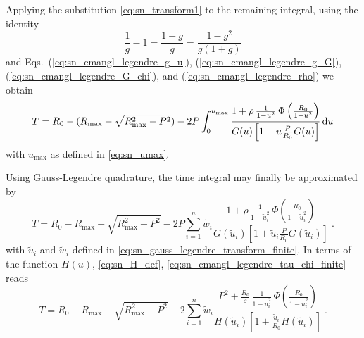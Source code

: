 Applying the substitution \cref{eq:sn_transform1} to the remaining integral, using the identity
%
\begin{equation*}
    \frac{1}{g} - 1 = \frac{1-g}{g} = \frac{1-g^2}{g(1+g)}
\end{equation*}
%
and Eqs.~(\ref{eq:sn_cmangl_legendre_g_u}), (\ref{eq:sn_cmangl_legendre_g_G}), (\ref{eq:sn_cmangl_legendre_G_chi}), and (\ref{eq:sn_cmangl_legendre_rho})
we obtain
%
\begin{equation}
    \label{eq:sn_reduced_tau_finite_G_legendre}
    T = R_0 -
        (R_\mathrm{max} - \sqrt{ R_\mathrm{max}^2 - P^2 }) - 2 P \int_0^{u_\mathrm{max}}
        \frac{ 1 + \rho \, \frac{ 1 }{ 1-u^2 } \, \Phi \left( \frac{R_0}{1-u^2} \right) }{
            G(u) \left[ 1 + u \frac{P}{R_0} G(u) \right] }
        \, \mathrm{d}u \\
\end{equation}
%
with $u_\mathrm{max}$ as defined in \cref{eq:sn_umax}.

Using Gauss-Legendre quadrature, the time integral may finally be approximated by
%
\begin{equation}
    \label{eq:sn_cmangl_legendre_tau_chi_finite}
    T = R_0 - R_\mathrm{max} + \sqrt{ R_\mathrm{max}^2 - P^2 } -
    2 P \sum_{i=1}^n \tilde{w}_i
    \frac{ 1 + \rho \, \frac{ 1 }{ 1-\tilde{u}_i^2 } \, \Phi \left( \frac{R_0}{1-\tilde{u}_i^2} \right) }{
        G(\tilde{u}_i) \left[ 1 + \tilde{u}_i \frac{P}{R_0} G(\tilde{u}_i) \right] } ~.
\end{equation}
%
with $\tilde{u}_i$ and $\tilde{w}_i$ defined in \cref{eq:sn_gauss_legendre_transform_finite}.
In terms of the function $H(u)$, \cref{eq:sn_H_def}, \cref{eq:sn_cmangl_legendre_tau_chi_finite} reads
%
\begin{equation}
    \label{eq:sn_cmangl_legendre_tau_H_finite}
    T = R_0 - R_\mathrm{max} + \sqrt{ R_\mathrm{max}^2 - P^2 } -
        2 \sum_{i=1}^n \tilde{w}_i
        \frac{ P^2 + \frac{R_0}{\varepsilon} \, \frac{ 1 }{ 1-\tilde{u}_i^2 } \, \Phi \left( \frac{R_0}{1-\tilde{u}_i^2} \right) }{
        H(\tilde{u}_i) \left[ 1 + \frac{\tilde{u}_i}{R_0} H(\tilde{u}_i) \right] } ~.
\end{equation}


